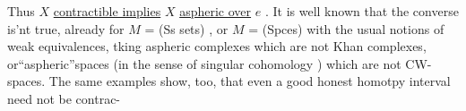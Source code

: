 Thus $X$ \uline{contractible implies} $X$ \uline{aspheric over} $e$ .  It is well known
that the converse is'nt true,  already for  $M$ = (Ss sets) , or
$M$ = (Spces)  with the usual notions of weak equivalences,  tking aspheric
complexes which are not Khan complexes,  or``aspheric''spaces (in the sense
of singular cohomology )  which are not CW-spaces.  The same examples
show, too,  that even a good honest homotpy interval need not be contrac-%


